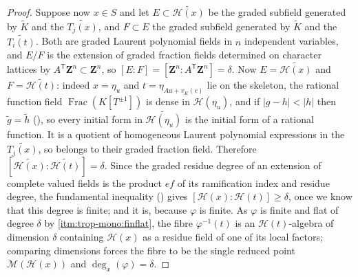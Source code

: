 \begin{proof}
Suppose now $x\in S$ and let $E\subset\widetilde{\mathcal H(x)}$ be the
graded subfield generated by $\widetilde K$ and the $\widetilde{T_j(x)}$,
and $F\subset E$ the graded subfield generated by $\widetilde K$ and the
$\widetilde{T_i(t)}$. Both are graded Laurent polynomial fields in $n$
independent variables, and $E/F$ is the extension of graded fraction fields
determined on character lattices by
$A^{\mathsf T}\mathbf Z^n\subset\mathbf Z^n$, so
$[E:F]=[\mathbf Z^n:A^{\mathsf T}\mathbf Z^n]=\delta$. Now $E=\widetilde{\mathcal H(x)}$
and $F=\widetilde{\mathcal H(t)}$: indeed $x=\eta_u$ and $t=\eta_{Au+v_K(c)}$
lie on the skeleton, the rational function field
$\operatorname{Frac}(K[T^{\pm1}])$ is dense in $\mathcal H(\eta_u)$, and if
$|g-h|<|h|$ then $\widetilde g=\widetilde h$
(), so every initial form in
$\widetilde{\mathcal H(\eta_u)}$ is the initial form of a rational function.
It is a quotient of homogeneous Laurent polynomial expressions in the
$\widetilde{T_j(x)}$, so belongs to their graded fraction field. Therefore
$[\widetilde{\mathcal H(x)}:\widetilde{\mathcal H(t)}]=\delta$. Since the
graded residue degree of an extension of complete valued fields is the
product $ef$ of its ramification index and residue degree, the fundamental
inequality () gives
$[\mathcal H(x):\mathcal H(t)]\ge\delta$, once we know that this degree is
finite; and it is, because $\varphi$ is finite. As $\varphi$ is finite
and flat of degree $\delta$ by \cref{itm:trop-mono:finflat}, the fibre
$\varphi^{-1}(t)$ is an $\mathcal H(t)$-algebra of dimension $\delta$
containing $\mathcal H(x)$ as a residue field of one of its local factors;
comparing dimensions forces the fibre to be the single reduced point
$\mathcal M(\mathcal H(x))$ and $\deg_x(\varphi)=\delta$.
\end{proof}

